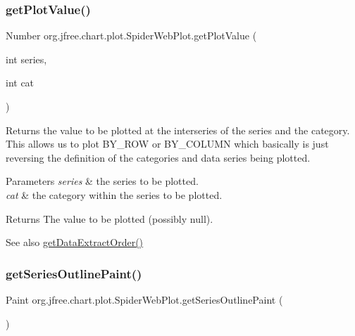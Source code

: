 \subsubsection{\texorpdfstring{get\+Plot\+Value()}{getPlotValue()}}
{\footnotesize\ttfamily Number org.\+jfree.\+chart.\+plot.\+Spider\+Web\+Plot.\+get\+Plot\+Value (\begin{DoxyParamCaption}\item[{int}]{series,  }\item[{int}]{cat }\end{DoxyParamCaption})\hspace{0.3cm}{\ttfamily [protected]}}

Returns the value to be plotted at the interseries of the series and the category. This allows us to plot {\ttfamily B\+Y\+\_\+\+R\+OW} or {\ttfamily B\+Y\+\_\+\+C\+O\+L\+U\+MN} which basically is just reversing the definition of the categories and data series being plotted.


\begin{DoxyParams}{Parameters}
{\em series} & the series to be plotted. \\
\hline
{\em cat} & the category within the series to be plotted.\\
\hline
\end{DoxyParams}
\begin{DoxyReturn}{Returns}
The value to be plotted (possibly {\ttfamily null}).
\end{DoxyReturn}
\begin{DoxySeeAlso}{See also}
\mbox{\hyperlink{classorg_1_1jfree_1_1chart_1_1plot_1_1_spider_web_plot_a858c1204ab0567e08d765226ff57d2b3}{get\+Data\+Extract\+Order()}} 
\end{DoxySeeAlso}
\mbox{\label{classorg_1_1jfree_1_1chart_1_1plot_1_1_spider_web_plot_a3b53e7767027e4ffb571420e3488cb4d}} 
\subsubsection{\texorpdfstring{get\+Series\+Outline\+Paint()}{getSeriesOutlinePaint()}\hspace{0.1cm}{\footnotesize\ttfamily [1/2]}}
{\footnotesize\ttfamily Paint org.\+jfree.\+chart.\+plot.\+Spider\+Web\+Plot.\+get\+Series\+Outline\+Paint (\begin{DoxyParamCaption}{ }\end{DoxyParamCaption})}

